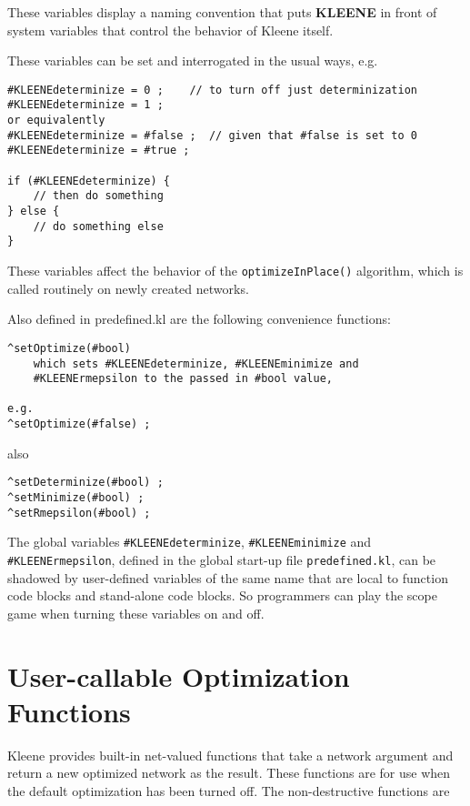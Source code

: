 \noindent
These variables display a naming convention that puts \textbf{KLEENE} in front
of system variables that control the behavior of Kleene itself.

These variables can be set and interrogated in the usual ways, e.g.

\begin{Verbatim}[fontsize=\small]
#KLEENEdeterminize = 0 ;	// to turn off just determinization
#KLEENEdeterminize = 1 ;
or equivalently
#KLEENEdeterminize = #false ;  // given that #false is set to 0
#KLEENEdeterminize = #true ;

if (#KLEENEdeterminize) {
    // then do something
} else {
    // do something else
}
\end{Verbatim}

\noindent 
These variables affect the behavior of the \texttt{optimizeInPlace()}
algorithm, which is called routinely on newly created networks.

Also defined in predefined.kl are the following convenience functions:

\begin{Verbatim}[fontsize=\small]
^setOptimize(#bool)
	which sets #KLEENEdeterminize, #KLEENEminimize and
	#KLEENErmepsilon to the passed in #bool value, 
	
e.g.
^setOptimize(#false) ;
\end{Verbatim}

\noindent
also

\begin{Verbatim}[fontsize=\small]
^setDeterminize(#bool) ;
^setMinimize(#bool) ;
^setRmepsilon(#bool) ;
\end{Verbatim}

The global variables \verb!#KLEENEdeterminize!, \verb!#KLEENEminimize!
and \verb!#KLEENErmepsilon!, defined in the global start-up file
\texttt{predefined.kl}, can be shadowed by user-defined variables of the same
name that are local to function code blocks and stand-alone code blocks.
So programmers can play the scope game when turning these variables on
and off.

\section{User-callable Optimization Functions}

Kleene provides built-in net-valued functions that take a network
argument and return a new optimized network as the result.  These
functions are for use when the default optimization has been turned off.
The non-destructive functions are

